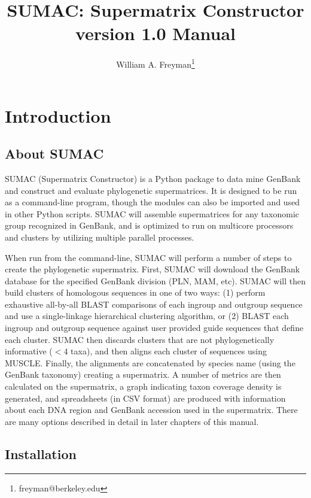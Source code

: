 \documentclass[12pt]{report}
\title{SUMAC: Supermatrix Constructor version 1.0 Manual}
\author{William A. Freyman\thanks{freyman@berkeley.edu}}
\affil{Department of Integrative Biology, University of California, Berkeley}
\date{}
\begin{document}
\maketitle

\tableofcontents


\chapter{Introduction}

\section{About SUMAC}

SUMAC (Supermatrix Constructor) is a Python package to 
data mine GenBank and construct
and evaluate phylogenetic supermatrices. 
It is designed to be run as a command-line program, though
the modules can also be imported and used in other Python scripts.
SUMAC will assemble
supermatrices for any taxonomic group recognized in GenBank,
and is optimized to run on multicore processors and clusters by utilizing multiple parallel processes.

When run from the command-line, SUMAC will perform a number of steps to create
the phylogenetic supermatrix. 
First, SUMAC will download the GenBank database for the specified GenBank division (PLN, MAM, etc).
SUMAC will then build clusters of homologous sequences in one of two ways:
(1) perform exhaustive all-by-all BLAST comparisons of each ingroup and outgroup sequence
and use a single-linkage hierarchical clustering algorithm, or
(2) BLAST each ingroup and outgroup sequence against user provided guide sequences
that define each cluster.
SUMAC then discards clusters that are not phylogenetically informative ($< 4$ taxa), 
and then aligns each cluster of sequences using MUSCLE.
Finally, the alignments are concatenated by species name (using the GenBank taxonomy) 
creating a supermatrix. A number of metrics are then calculated on the supermatrix, 
a graph indicating taxon coverage density is generated, and spreadsheets (in CSV format)
are produced with information about each DNA region and GenBank accession used in 
the supermatrix. 
There are many options described in
detail in later chapters of this manual. 


\section{Installation}
\end{document}
